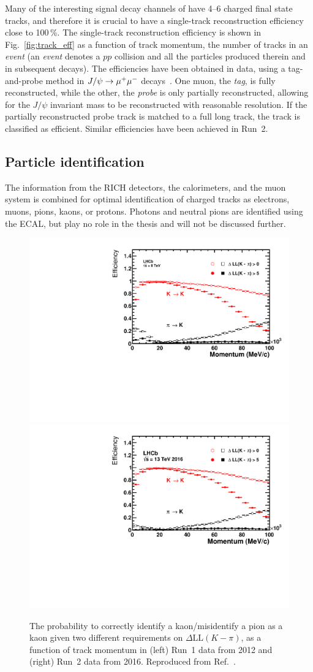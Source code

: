 Many of the interesting signal decay channels of \lhcb have 4--6 charged final state tracks, and therefore it is crucial to have a single-track reconstruction efficiency close to 100\,\%. The single-track reconstruction efficiency is shown in Fig.~\ref{fig:track_eff} as a function of track momentum,  the number of tracks in an \emph{event} (an \emph{event} denotes a $pp$ collision and all the particles produced therein and in subsequent decays). The efficiencies have been obtained in data, using a tag-and-probe method in $J/\psi\rightarrow{\ensuremath{\mu^+}}\mu^-$ decays~\cite{TrackEff}. One muon, the \emph{tag}, is fully reconstructed, while the other, the \emph{probe} is only partially reconstructed, allowing for the $J/\psi$ invariant mass to be reconstructed with reasonable resolution. If the partially reconstructed probe track is matched to a full long track, the track is classified as efficient.
Similar efficiencies have been achieved in Run~2.




\subsection{Particle identification} %
\label{sub:particle_identification}
The information from the RICH detectors, the calorimeters, and the muon system is combined for optimal identification of charged tracks as electrons, muons, pions, kaons, or protons. Photons and neutral pions are identified using the ECAL, but play no role in the thesis and will not be discussed further.

\begin{figure}[tb]
    \centering
    \includegraphics[width=0.45\columnwidth]{figures/detector/PIDK_Run1.pdf}
    \includegraphics[width=0.45\columnwidth]{figures/detector/PIDK_Run2.pdf}
    \caption{The probability to correctly identify a kaon/misidentify a pion as a kaon given two different requirements on $\Delta \mathrm{LL}(K-\pi)$, as a function of track momentum in (left) Run~1 data from 2012 and (right) Run~2 data from 2016. Reproduced from Ref.~\cite{PIDplots}.}
    \label{fig:PID_performance}
\end{figure}

